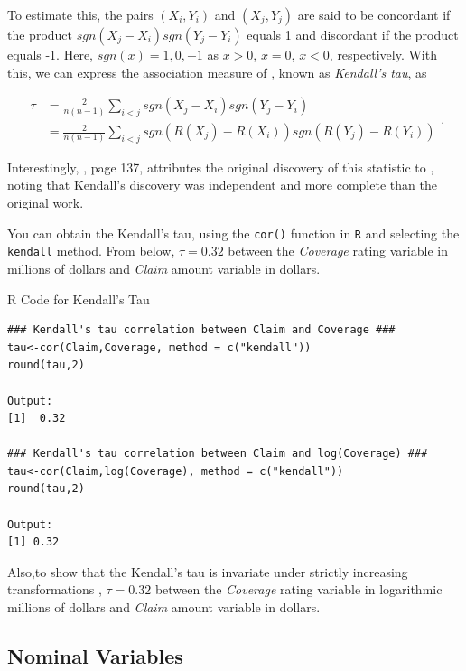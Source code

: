 \documentclass[]{book}
\theoremstyle{definition}
\theoremstyle{definition}
\theoremstyle{definition}
\theoremstyle{remark}
\begin{document}
To estimate this, the pairs \((X_i,Y_i)\) and \((X_j,Y_j)\) are said to
be concordant if the product \(sgn(X_j-X_i)sgn(Y_j-Y_i)\) equals 1 and
discordant if the product equals -1. Here, \(sgn(x)=1,0,-1\) as \(x>0\),
\(x=0\), \(x<0\), respectively. With this, we can express the
association measure of \citep{kendall1938new}, known as \emph{Kendall's
tau}, as

\begin{equation*}
\begin{array}{rl}
\tau &= \frac{2}{n(n-1)} \sum_{i<j}sgn(X_j-X_i)sgn(Y_j-Y_i)\\
&= \frac{2}{n(n-1)} \sum_{i<j}sgn(R(X_j)-R(X_i))sgn(R(Y_j)-R(Y_i)) 
\end{array}.
\end{equation*}

Interestingly, \citep{hougaard2000analysis}, page 137, attributes the
original discovery of this statistic to
\citep{fechnerkollektivmasslehre}, noting that Kendall's discovery was
independent and more complete than the original work.

You can obtain the Kendall's tau, using the \texttt{cor()} function in
\texttt{R} and selecting the \texttt{kendall} method. From below,
\(\tau=0.32\) between the \emph{Coverage} rating variable in millions of
dollars and \emph{Claim} amount variable in dollars.

R Code for Kendall's Tau

\hypertarget{display.kendall.2}{}
\begin{verbatim}
### Kendall's tau correlation between Claim and Coverage ###
tau<-cor(Claim,Coverage, method = c("kendall"))
round(tau,2)

Output:
[1]  0.32

### Kendall's tau correlation between Claim and log(Coverage) ###
tau<-cor(Claim,log(Coverage), method = c("kendall"))
round(tau,2)

Output:
[1] 0.32
\end{verbatim}

Also,to show that the Kendall's tau is invariate under strictly
increasing transformations , \(\tau=0.32\) between the \emph{Coverage}
rating variable in logarithmic millions of dollars and \emph{Claim}
amount variable in dollars.

\subsection{Nominal Variables}\label{nominal-variables}
\end{document}
